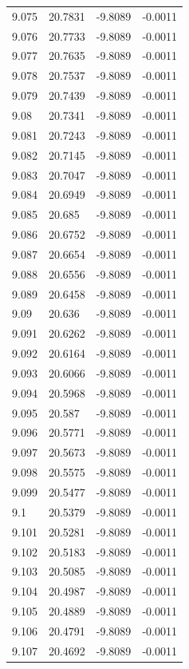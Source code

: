 \begin{tabular}{llll}
9.075 & 20.7831 & -9.8089 & -0.0011 \\
9.076 & 20.7733 & -9.8089 & -0.0011 \\
9.077 & 20.7635 & -9.8089 & -0.0011 \\
9.078 & 20.7537 & -9.8089 & -0.0011 \\
9.079 & 20.7439 & -9.8089 & -0.0011 \\
9.08 & 20.7341 & -9.8089 & -0.0011 \\
9.081 & 20.7243 & -9.8089 & -0.0011 \\
9.082 & 20.7145 & -9.8089 & -0.0011 \\
9.083 & 20.7047 & -9.8089 & -0.0011 \\
9.084 & 20.6949 & -9.8089 & -0.0011 \\
9.085 & 20.685 & -9.8089 & -0.0011 \\
9.086 & 20.6752 & -9.8089 & -0.0011 \\
9.087 & 20.6654 & -9.8089 & -0.0011 \\
9.088 & 20.6556 & -9.8089 & -0.0011 \\
9.089 & 20.6458 & -9.8089 & -0.0011 \\
9.09 & 20.636 & -9.8089 & -0.0011 \\
9.091 & 20.6262 & -9.8089 & -0.0011 \\
9.092 & 20.6164 & -9.8089 & -0.0011 \\
9.093 & 20.6066 & -9.8089 & -0.0011 \\
9.094 & 20.5968 & -9.8089 & -0.0011 \\
9.095 & 20.587 & -9.8089 & -0.0011 \\
9.096 & 20.5771 & -9.8089 & -0.0011 \\
9.097 & 20.5673 & -9.8089 & -0.0011 \\
9.098 & 20.5575 & -9.8089 & -0.0011 \\
9.099 & 20.5477 & -9.8089 & -0.0011 \\
9.1 & 20.5379 & -9.8089 & -0.0011 \\
9.101 & 20.5281 & -9.8089 & -0.0011 \\
9.102 & 20.5183 & -9.8089 & -0.0011 \\
9.103 & 20.5085 & -9.8089 & -0.0011 \\
9.104 & 20.4987 & -9.8089 & -0.0011 \\
9.105 & 20.4889 & -9.8089 & -0.0011 \\
9.106 & 20.4791 & -9.8089 & -0.0011 \\
9.107 & 20.4692 & -9.8089 & -0.0011 \\

\end{tabular}
